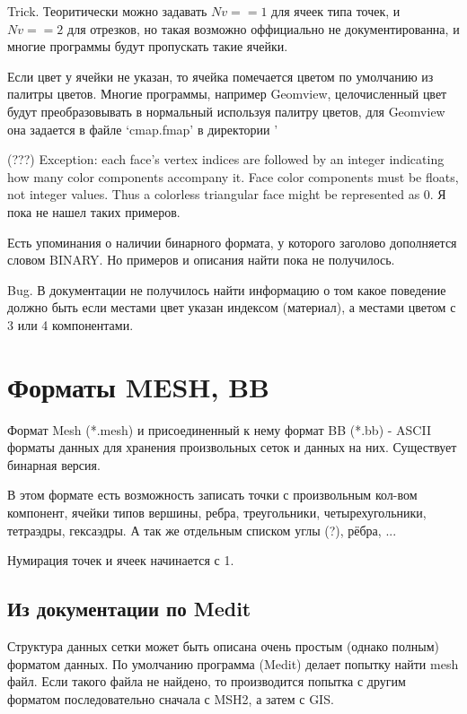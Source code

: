 \documentclass[a4paper,12pt]{article}
\begin{document}
Trick. Теоритически можно задавать $Nv==1$ для ячеек типа точек, и $Nv==2$ для отрезков, но такая возможно оффициально не документированна, и многие программы будут пропускать такие ячейки.

Если цвет у ячейки не указан, то ячейка помечается цветом по умолчанию из палитры цветов.
Многие программы, например Geomview, целочисленный цвет будут преобразовывать в нормальный используя палитру цветов, для Geomview она задается в файле `cmap.fmap' в директории '%

(???) Exception: each face's vertex indices are followed by an integer indicating how many color components accompany it. Face color components must be floats, not integer values. Thus a colorless triangular face might be represented as 0. Я пока не нашел таких примеров.

Есть упоминания о наличии бинарного формата, у которого заголово дополняется словом BINARY. Но примеров и описания найти пока не получилось.

Bug. В документации не получилось найти информацию о том какое поведение должно быть если местами цвет указан индексом (материал), а местами цветом с 3 или 4 компонентами.

\clearpage

\section{Форматы MESH, BB}

Формат Mesh (*.mesh) и присоединенный к нему формат BB (*.bb) - ASCII форматы данных для хранения произвольных сеток и данных на них. Существует бинарная версия.

В этом формате есть возможность записать точки с произвольным кол-вом компонент, ячейки типов вершины, ребра, треугольники, четырехугольники, тетраэдры, гексаэдры. А так же отдельным списком углы (?), рёбра, ...

Нумирация точек и ячеек начинается с 1.

\subsection{Из документации по Medit}

Структура данных сетки может быть описана очень простым (однако полным) форматом данных. По умолчанию программа (Medit) делает попытку найти mesh файл. Если такого файла не найдено, то производится попытка с другим форматом последовательно сначала с MSH2, а затем с GIS.
\end{document}
